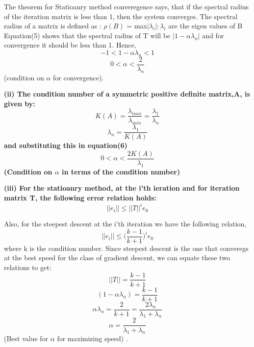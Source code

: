 \documentclass{article}
\begin{document}
 The theorem for Statioanry method converegence says, that if the spectral radius of the iteration matrix is less than 1, then the system converges. The spectral radius of a matrix is defined as : \newline
 $\rho (B)$ = max{$|\lambda_i|: \lambda_i$ are the eigen values of B} \newline
 Equation(5) shows that the spectral radius of T will be $|1 - \alpha \lambda_n|$ and for convergence it should be less than 1. Hence, \newline
 \[-1 < 1 - \alpha \lambda_n < 1\]
 \begin{equation}
  0 < \alpha < \dfrac{2}{\lambda_n}
 \end{equation}
 (condition on $\alpha$ for convergence).


  \bf {(ii)} The condition number of a symmetric positive definite matrix,A, is given by: \newline
  \[K(A) = \dfrac{\lambda_{max}}{\lambda_{min}} = \dfrac{\lambda_1}{\lambda_n}\]
  \[ \lambda_n = \dfrac{\lambda_1}{K(A)}\]
  and substituting this in equation(6) \newline
  \begin{equation}
	  0 < \alpha < \dfrac{2K(A)}{\lambda_1}
  \end{equation}
  (Condition on $\alpha$ in terms of the condition number) \newline

  \bf {(iii)} For the statioanry method, at the i'th ieration and for iteration matrix T, the following error relation holds: \newline
  \[ ||e_i|| \leq ||T||^i e_0\]

  Also, for the steepest descent at the i'th iteration we have the following relation,
  \[ ||e_i|| \leq \bigg ( \dfrac{k-1}{k+1} \bigg )^i e_0\]
  where k is the condition number. Since steepest descent is the one that converegs at the best speed for the class of gradient descent, we can equate these two relations to get: \newline
  \[ ||T|| = \dfrac{k-1}{k+1}\]
  \[ (1-\alpha \lambda_n) = \dfrac{k-1}{k+1}\]
  \[ \alpha \lambda_n = \dfrac{2}{k+1} = \dfrac{2\lambda_n}{\lambda_1 + \lambda_n}\]
  \[ \alpha = \dfrac{2}{\lambda_1 + \lambda_n}\]
  (Best value for $\alpha$ for maximizing speed) . \newline
\end{document}
